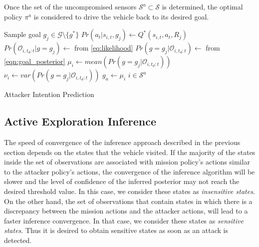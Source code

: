 \documentclass[letterpaper, 10 pt, conference]{ieeeconf}  %
\begin{document}
Once the set of the uncompromised sensors $\mathcal{S}^a \subset \mathcal S$ is determined, the optimal policy $\pi^a$ is considered to drive the vehicle back to its desired goal.

\begin{algorithm}\label{alg:alg1}
    {
        {
            Sample goal $g_j \in \mathcal{G} \setminus \{g^*\}$\;
            $Pr(a_t|s_{i,t},g_j) \leftarrow Q^*(s_{i,t},a_t,R_j)$\;
            $Pr(\mathcal{O}_{i,t_d:t}|g=g_j) \leftarrow$  from \eqref{eq:likelihood}\;
            $Pr(g=g_j|\mathcal{O}_{i,t_d:t}) \leftarrow$ from \eqref{eqn:goal_posterior}\;
        }
        $\mu_i \leftarrow mean(Pr(g=g_j|\mathcal{O}_{i,t_d:t}))$\;
        $\nu_i \leftarrow  var(Pr(g=g_j|\mathcal{O}_{i,t_d:t}))$\;
        {
            $g_a \leftarrow \mu_i$\;
            $i \in \mathcal{S}^a$\;
        }
    }
    \caption{Attacker Intention Prediction}
\end{algorithm}

\subsection{Active Exploration Inference}\label{sec:approach2}
The speed of convergence of the inference approach described in the previous section depends on the states that the vehicle visited. If the majority of the states inside the set of observations are associated with mission policy's actions similar to the attacker policy's actions, the convergence of the inference algorithm will be slower and the level of confidence of the inferred posterior may not reach the desired threshold value. In this case, we consider these states as {\em insensitive states}. On the other hand, the set of observations that contain states in which there is a discrepancy between the mission actions and the attacker actions, will lead to a faster inference convergence. In that case, we consider these states as {\em sensitive states}. Thus it is desired to obtain sensitive states as soon as an attack is detected.
\end{document}

